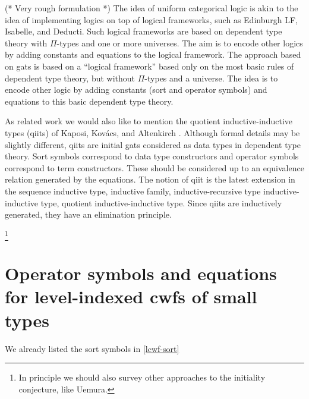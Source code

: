 \documentclass[11pt,a4paper]{article}
\theoremstyle{definition}
\def\lp{\mathrm{lp}}
\newcommand{\tuple}[1]{\langle #1 \rangle}
\def\p{\mathrm{p}}
\def\q{\mathrm{q}}
\begin{document}
(* Very rough formulation *) The idea of uniform categorical logic is akin to the idea of implementing logics on top of logical frameworks, such as Edinburgh LF, Isabelle, and Deducti. Such logical frameworks are based on dependent type theory with $\Pi$-types and one or more universes. The aim is to encode other logics by adding constants and equations to the logical framework. The approach based on gats is based on a ``logical framework'' based only on the most basic rules of dependent type theory, but without $\Pi$-types and a universe. The idea is to encode other logic by adding constants (sort and operator symbols) and equations to this basic dependent type theory.

As related work we would also like to mention the quotient inductive-inductive types (qiits) of Kaposi, Kov{\'{a}}cs, and Altenkirch
\cite{kaposi:qiits,kovacs:phd}. Although formal details may be slightly different, qiits are initial gats considered as data types in dependent type theory. Sort symbols correspond to data type constructors and operator symbols correspond to term constructors. These should be considered up to an equivalence relation generated by the equations. The notion of qiit is the latest extension in the sequence inductive type, inductive family, inductive-recursive type inductive-inductive type, quotient inductive-inductive type. Since qiits are inductively generated, they have an elimination principle. 

\footnote{In principle we should also survey other approaches to the initiality conjecture, like Uemura.}

\appendix
\section{Operator symbols and equations for level-indexed cwfs of small types}

We already listed the sort symbols in \ref{lcwf-sort}
\end{document}
